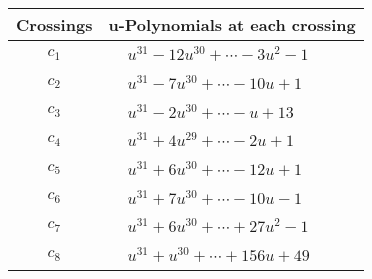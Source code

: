 \documentclass[1p]{elsarticle_modified}
\theoremstyle{definition}
\begin{document}
\begin{tabular}{m{50pt}|m{274pt}}
Crossings & \hspace{64pt}u-Polynomials at each crossing \\
\hline $$\begin{aligned}c_{1}\end{aligned}$$&$\begin{aligned}
&u^{31}-12 u^{30}+\cdots-3 u^2-1
\end{aligned}$\\
\hline $$\begin{aligned}c_{2}\end{aligned}$$&$\begin{aligned}
&u^{31}-7 u^{30}+\cdots-10 u+1
\end{aligned}$\\
\hline $$\begin{aligned}c_{3}\end{aligned}$$&$\begin{aligned}
&u^{31}-2 u^{30}+\cdots- u+13
\end{aligned}$\\
\hline $$\begin{aligned}c_{4}\end{aligned}$$&$\begin{aligned}
&u^{31}+4 u^{29}+\cdots-2 u+1
\end{aligned}$\\
\hline $$\begin{aligned}c_{5}\end{aligned}$$&$\begin{aligned}
&u^{31}+6 u^{30}+\cdots-12 u+1
\end{aligned}$\\
\hline $$\begin{aligned}c_{6}\end{aligned}$$&$\begin{aligned}
&u^{31}+7 u^{30}+\cdots-10 u-1
\end{aligned}$\\
\hline $$\begin{aligned}c_{7}\end{aligned}$$&$\begin{aligned}
&u^{31}+6 u^{30}+\cdots+27 u^2-1
\end{aligned}$\\
\hline $$\begin{aligned}c_{8}\end{aligned}$$&$\begin{aligned}
&u^{31}+u^{30}+\cdots+156 u+49
\end{aligned}$\\

\end{tabular}
\end{document}
